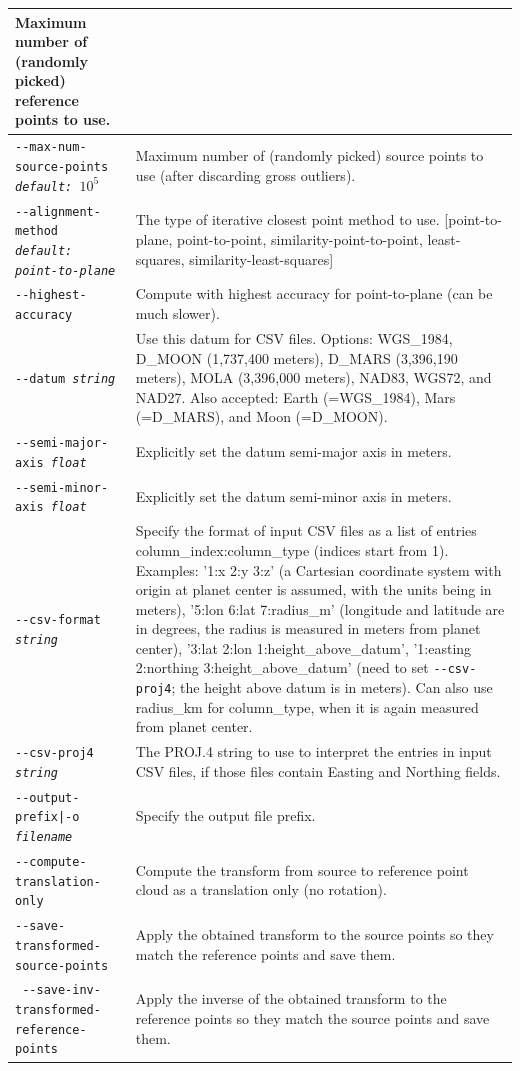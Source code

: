 \begin{longtable}{|p{8cm}|p{9cm}|}
Maximum number of (randomly picked) reference points to use. \\ \hline
\texttt{-\/-max-num-source-points \textit{default: $10^5$}} & Maximum number of (randomly picked) source points to use (after discarding gross outliers). \\ \hline
\texttt{-\/-alignment-method \textit{default: point-to-plane}} & The type of iterative closest point method to use. [point-to-plane, point-to-point, similarity-point-to-point, least-squares, similarity-least-squares]\\ \hline
\texttt{-\/-highest-accuracy} & Compute with highest accuracy for point-to-plane (can be much slower). \\ \hline

\texttt{-\/-datum \textit{string}} & Use this datum for CSV files. Options: WGS\_1984, D\_MOON (1,737,400 meters), D\_MARS (3,396,190 meters), MOLA (3,396,000 meters), NAD83, WGS72, and NAD27. Also accepted: Earth (=WGS\_1984), Mars (=D\_MARS), and Moon (=D\_MOON). \\ \hline

\texttt{-\/-semi-major-axis \textit{float}} & Explicitly set the datum semi-major axis in meters.\\ \hline
\texttt{-\/-semi-minor-axis \textit{float}} & Explicitly set the datum semi-minor axis in meters.\\ \hline

\texttt{-\/-csv-format \textit{string}} & Specify the format of input
CSV files as a list of entries column\_index:column\_type (indices start
from 1). Examples: '1:x 2:y 3:z' (a Cartesian coordinate system with
origin at planet center is assumed, with the units being in meters),
'5:lon 6:lat 7:radius\_m' (longitude and latitude are in degrees, the
radius is measured in meters from planet center), '3:lat 2:lon
1:height\_above\_datum', '1:easting 2:northing 3:height\_above\_datum'
(need to set \texttt{-\/-csv-proj4}; the height above datum is in
meters). Can also use radius\_km for column\_type, when it is again
measured from planet center. \\ \hline

\texttt{-\/-csv-proj4 \textit{string}} & The PROJ.4 string to use to
interpret the entries in input CSV files, if those files contain Easting
and Northing fields.  \\ \hline

\texttt{-\/-output-prefix|-o \textit{filename}} & Specify the output file prefix. \\ \hline
\texttt{-\/-compute-translation-only} & Compute the transform from source to reference point cloud as a translation only (no rotation). \\ \hline
\texttt{-\/-save-transformed-source-points} & Apply the obtained transform to the source points so they match the reference points and save them. \\ \hline
\texttt{ -\/-save-inv-transformed-reference-points} & Apply the inverse of the obtained transform to the reference points so they match the source points and save them.
\\ \hline


\end{longtable}
